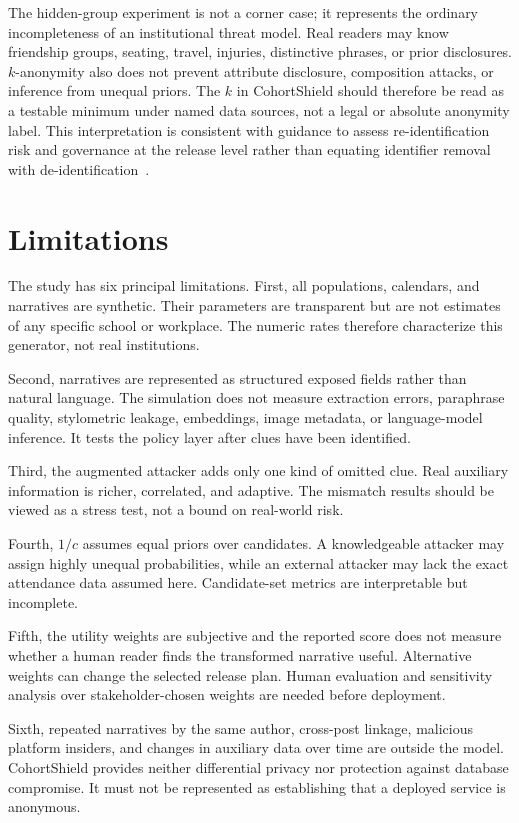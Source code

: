 \documentclass[pdflatex,sn-mathphys-num]{sn-jnl}
\theoremstyle{plain}
\begin{document}
The hidden-group experiment is not a corner case; it represents the ordinary incompleteness of an institutional threat model. Real readers may know friendship groups, seating, travel, injuries, distinctive phrases, or prior disclosures. $k$-anonymity also does not prevent attribute disclosure, composition attacks, or inference from unequal priors. The $k$ in CohortShield should therefore be read as a testable minimum under named data sources, not a legal or absolute anonymity label. This interpretation is consistent with guidance to assess re-identification risk and governance at the release level rather than equating identifier removal with de-identification~\cite{nist2023}.

\section{Limitations}\label{sec:limitations}

The study has six principal limitations. First, all populations, calendars, and narratives are synthetic. Their parameters are transparent but are not estimates of any specific school or workplace. The numeric rates therefore characterize this generator, not real institutions.

Second, narratives are represented as structured exposed fields rather than natural language. The simulation does not measure extraction errors, paraphrase quality, stylometric leakage, embeddings, image metadata, or language-model inference. It tests the policy layer after clues have been identified.

Third, the augmented attacker adds only one kind of omitted clue. Real auxiliary information is richer, correlated, and adaptive. The mismatch results should be viewed as a stress test, not a bound on real-world risk.

Fourth, $1/c$ assumes equal priors over candidates. A knowledgeable attacker may assign highly unequal probabilities, while an external attacker may lack the exact attendance data assumed here. Candidate-set metrics are interpretable but incomplete.

Fifth, the utility weights are subjective and the reported score does not measure whether a human reader finds the transformed narrative useful. Alternative weights can change the selected release plan. Human evaluation and sensitivity analysis over stakeholder-chosen weights are needed before deployment.

Sixth, repeated narratives by the same author, cross-post linkage, malicious platform insiders, and changes in auxiliary data over time are outside the model. CohortShield provides neither differential privacy nor protection against database compromise. It must not be represented as establishing that a deployed service is anonymous.
\end{document}
